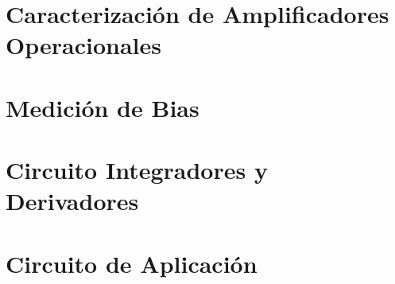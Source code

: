








\tableofcontents
\newpage


\section{Caracterización de Amplificadores Operacionales}
	
\newpage	
\section{Medición de Bias}
    
\newpage
\section{Circuito Integradores y Derivadores}
    
    \newpage
\section{Circuito de Aplicación}
    
    \newpage





